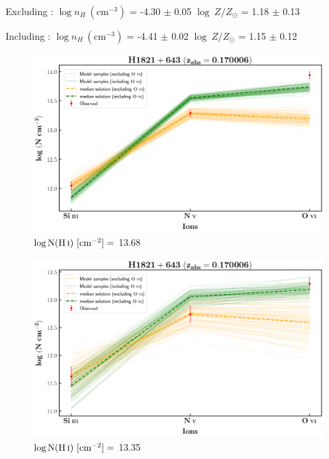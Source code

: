   Excluding  : $\log n_H \ (\text{cm}^{-3})$ = -4.30 $\pm$ 0.05 \hspace{10mm} $\log \ Z/Z_\odot$ = 1.18 $\pm$ 0.13
  
  Including  : $\log n_H \ (\text{cm}^{-3})$ = -4.41 $\pm$ 0.02 \hspace{10mm} $\log \ Z/Z_\odot$ = 1.15 $\pm$ 0.12
  
  
  \newpage
  
  \begin{figure}[!h]
      \centering
      \includegraphics[width=0.9\linewidth]{Ionisation-Modelling-Plots/h1821-z=0.170006-compII.png}
      \caption{$\log \text{N}(\ion{H}{i}) \ [\text{cm}^{-2}]=$ 13.68}
  \end{figure}
  
  \begin{figure}[!b]
      \centering
      \includegraphics[width=0.9\linewidth]{Ionisation-Modelling-Plots/h1821-z=0.170006-compIII.png}
      \caption{$\log \text{N}(\ion{H}{i}) \ [\text{cm}^{-2}]=$ 13.35}
  \end{figure}
  
  
  \newpage
  \thispagestyle{empty}

